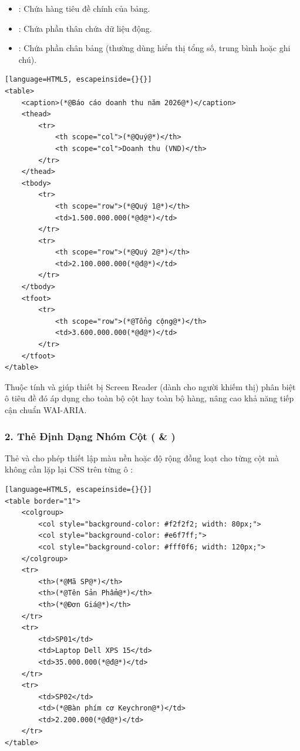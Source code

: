 \begin{itemize}[leftmargin=1.8em, itemsep=2pt, parsep=0pt]
    \item {}: Chứa hàng tiêu đề chính của bảng.
    \item {}: Chứa phần thân chứa dữ liệu động.
    \item {}: Chứa phần chân bảng (thường dùng hiển thị tổng số, trung bình hoặc ghi chú).
\end{itemize}

\begin{codeWindow}
\begin{lstlisting}[language=HTML5, escapeinside={}{}]
<table>
    <caption>(*@Báo cáo doanh thu năm 2026@*)</caption>
    <thead>
        <tr>
            <th scope="col">(*@Quý@*)</th>
            <th scope="col">Doanh thu (VND)</th>
        </tr>
    </thead>
    <tbody>
        <tr>
            <th scope="row">(*@Quý 1@*)</th>
            <td>1.500.000.000(*@đ@*)</td>
        </tr>
        <tr>
            <th scope="row">(*@Quý 2@*)</th>
            <td>2.100.000.000(*@đ@*)</td>
        </tr>
    </tbody>
    <tfoot>
        <tr>
            <th scope="row">(*@Tổng cộng@*)</th>
            <td>3.600.000.000(*@đ@*)</td>
        </tr>
    </tfoot>
</table>
\end{lstlisting}
\end{codeWindow}

Thuộc tính  và  giúp thiết bị Screen Reader (dành cho người khiếm thị) phân biệt ô tiêu đề đó áp dụng cho toàn bộ cột hay toàn bộ hàng, nâng cao khả năng tiếp cận chuẩn WAI-ARIA.

\subsubsection{2. Thẻ Định Dạng Nhóm Cột ( \& )}

Thẻ  và  cho phép thiết lập màu nền hoặc độ rộng đồng loạt cho từng cột mà không cần lặp lại CSS trên từng ô :

\begin{codeWindow}
\begin{lstlisting}[language=HTML5, escapeinside={}{}]
<table border="1">
    <colgroup>
        <col style="background-color: #f2f2f2; width: 80px;">
        <col style="background-color: #e6f7ff;">
        <col style="background-color: #fff0f6; width: 120px;">
    </colgroup>
    <tr>
        <th>(*@Mã SP@*)</th>
        <th>(*@Tên Sản Phẩm@*)</th>
        <th>(*@Đơn Giá@*)</th>
    </tr>
    <tr>
        <td>SP01</td>
        <td>Laptop Dell XPS 15</td>
        <td>35.000.000(*@đ@*)</td>
    </tr>
    <tr>
        <td>SP02</td>
        <td>(*@Bàn phím cơ Keychron@*)</td>
        <td>2.200.000(*@đ@*)</td>
    </tr>
</table>
\end{lstlisting}
\end{codeWindow}

